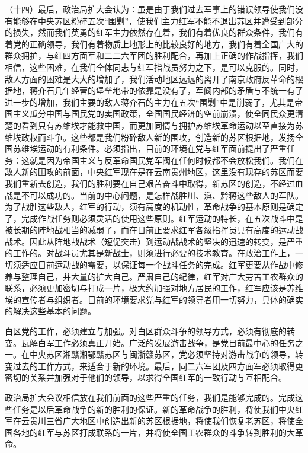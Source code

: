 （十四）最后，政治局扩大会认为：虽是由于我们过去军事上的错误领导使我们没有能够在中央苏区粉碎五次“围剿”，使我们主力红军不能不退出苏区并遭受到部分的损失，然而我们英勇的红军主力依然存在着，我们有着优良的群众条件，我们有着党的正确领导，我们有着物质上地形上的比较良好的地方，我们有着全国广大的群众拥护，与红四方面军和二二六军团的胜利配合，再加上正确的作战指挥，我们相信，这些困难，在我们全体同志与红军指战员努力之下，是可以克服的。同时，敌人方面的困难是大大的增加了，我们活动地区远远的离开了南京政府反革命的根据地，蒋介石几年经营的堡垒地带的依靠是没有了，军阀内部的矛盾与不统一有了进一步的增加，我们主要的敌人蒋介石的主力在五次“围剿”中是削弱了，尤其是帝国主义瓜分中国与国民党的卖国政策，全国国民经济的空前崩溃，使全同民众更清楚的看到只有苏维埃才能救中国，而更加同情与拥护苏维埃革命运动以至直接为苏维埃政权而斗争。这些都是我们粉碎敌人新的围攻，创造新的苏区根据地，发扬全国苏维埃运动的有利条件。必须指出，目前的环境在党与红军面前提出了严重任务：这就是因为帝国主义与反革命国民党军阀在任何时候都不会放松我们。我们在敌人新的围攻的前面，中央红军现在是在云南贵州地区，这里没有现存的苏区而要我们重新去创造，我们的胜利要在自己艰苦奋斗中取得，新苏区的创造，不经过血战是不可以成功的。当前的中心问题，是怎样战胜川、滇、黔蒋这些敌人的军队。为了战胜这些敌人，红军的行动，须有高度的机动性，革命战争的基本原则是确定了，完成作战任务则必须灵活的使用这些原则。红军运动的特长，在五次战斗中是被长期的阵地战相当的减弱了，而在目前正要求红军各级指挥员具有高度的运动战战术。因此从阵地战战术（短促突击）到运动战战术的坚决的迅速的转变，是严重的工作的。对战斗员尤其是新战士，则须进行必要的技术教育。在政治工作上，一切须适应目前运动战的需要，以保证每一个战斗任务的完成。红军更要从作战中修养与整理自己，并大量的扩大自己。严肃自己的纪律，红军对广大劳苦工农群众的联系，必须更加密切与打成一片，极大约加强对地方居民的工作，红军应该是苏维埃的宣传者与组织者。目前的环境要求党与红军的领导者用一切努力，具体的确实的解决这些基本的问题。

白区党的工作，必须建立与加强。对白区群众斗争的领导方式，必须有彻底的转变。瓦解白军工作必须真正开始。广泛的发展游击战争，是党目前最中心的任务之一。在中央苏区湘赣湘鄂赣苏区与闽浙赣苏区，党必须坚持对游击战争的领导，转变过去的工作方式，来适合于新的环境。最后，同二六军团及四方面军必须取得更密切的关系并加强对于他们的领导，以求得全国红军的一致行动与互相配合。

政治局扩大会议相信放在我们前面的这些严重的任务，我们是能够完成的。完成这些任务是以后革命战争的新的胜利的保证。新的革命战争的胜利，将使我们中央红军在云贵川三省广大地区中创造出新的苏区根据地，将使我们恢复老苏区，将使全国各地的红军与苏区打成联系的一片，并将使全国工农群众的斗争转到胜利的大革命。

